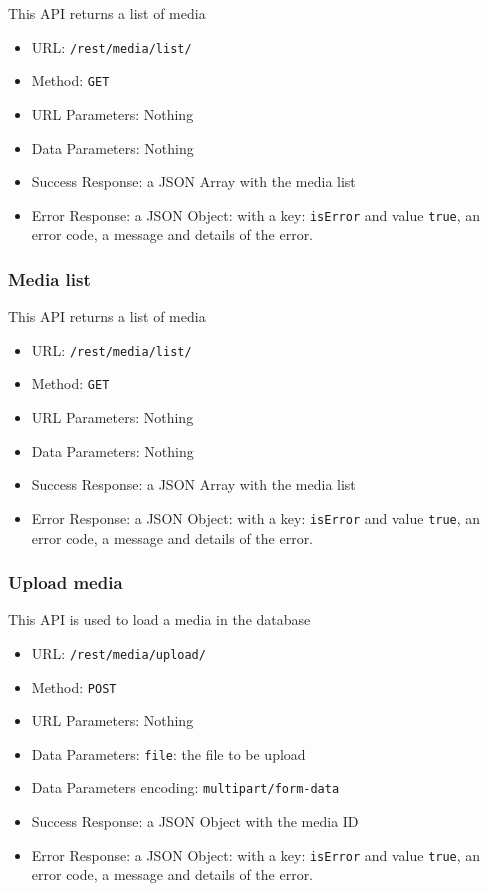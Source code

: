 This API returns a list of media

\begin{itemize}
    \item URL: \texttt{/rest/media/list/}
    \item Method: \texttt{GET}
    \item URL Parameters: Nothing
    \item Data Parameters: Nothing
    \item Success Response: a JSON Array with the media list
    \item Error Response: a JSON Object: with a key: \texttt{isError}  and value \texttt{true}, an error code, a message and details of the error.
\end{itemize}

\subsubsection*{Media list}

This API returns a list of media

\begin{itemize}
    \item URL: \texttt{/rest/media/list/}
    \item Method: \texttt{GET}
    \item URL Parameters: Nothing
    \item Data Parameters: Nothing
    \item Success Response: a JSON Array with the media list
    \item Error Response: a JSON Object: with a key: \texttt{isError}  and value \texttt{true}, an error code, a message and details of the error.
\end{itemize}

\subsubsection*{Upload media}

This API is used to load a media in the database

\begin{itemize}
    \item URL: \texttt{/rest/media/upload/}
    \item Method: \texttt{POST}
    \item URL Parameters: Nothing
    \item Data Parameters: \texttt{file}: the file to be upload
    \item Data Parameters encoding: \texttt{multipart/form-data}
    \item Success Response: a JSON Object with the media ID
    \item Error Response: a JSON Object: with a key: \texttt{isError}  and value \texttt{true}, an error code, a message and details of the error.
\end{itemize}

